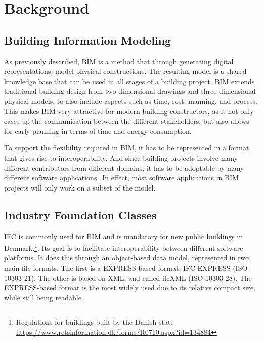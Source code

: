 \section{Background}
\label{sec:background}
\subsection{Building Information Modeling}
\label{sec:building_information_modeling}
As previously described, BIM is a method that through generating digital representations, model physical constructions. The resulting model is a shared knowledge base that can be used in all stages of a building project. BIM extends traditional building design from two-dimensional drawings and three-dimensional physical models, to also include aspects such as time, cost, manning, and process. This makes BIM very attractive for modern building constructors, as it not only eases up the communication between the different stakeholders, but also allows for early planning in terms of time and energy consumption.

To support the flexibility required in BIM, it has to be represented in a format that gives rise to interoperability. And since building projects involve many different contributors from different domains, it has to be adoptable by many different software applications\,\cite{quteprints37725}. In effect, most software applications in BIM projects will only work on a subset of the model.

\subsection{Industry Foundation Classes}
\label{sec:industry_foundation_classes}
IFC is commonly used for BIM and is mandatory for new public buildings in Denmark.\footnote{Regulations for buildings built by the Danish state \url{https://www.retsinformation.dk/forms/R0710.aspx?id=134884}}. Its goal is to facilitate interoperability between different software platforms. It does this through an object-based data model, represented in two main file formats. The first is a EXPRESS-based format, IFC-EXPRESS (ISO-10303-21). The other is based on XML, and called ifcXML (ISO-10303-28). The EXPRESS-based format is the most widely used due to its relative compact size, while still being readable.


